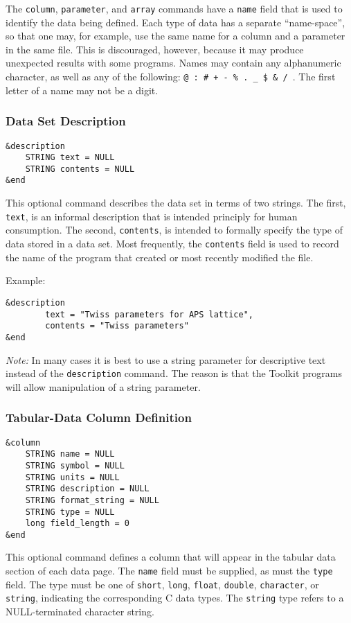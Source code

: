 \documentclass[11pt]{article}
\begin{document}
The {\tt column}, {\tt parameter}, and {\tt array} commands have a {\tt name} field that is used to identify the
data being defined.  Each type of data has a separate ``name-space'', so that one may, for example, use the same
name for a column and a parameter in the same file.  This is discouraged, however, because it may produce
unexpected results with some programs.  Names may contain any alphanumeric character, as well as any of the
following: {\tt @ : \# + - \% . \_ \$ \& / }.  The first letter of a name may not be a digit.


\subsubsection{Data Set Description}
\begin{verbatim}
&description 
    STRING text = NULL
    STRING contents = NULL
&end
\end{verbatim}

This optional command describes the data set in terms of two strings.  The first, {\tt text}, is an informal
description that is intended principly for human consumption.  The second, {\tt contents}, is intended to formally
specify the type of data stored in a data set.  Most frequently, the {\tt contents} field is used to record the
name of the program that created or most recently modified the file.

Example:
\begin{verbatim}
&description
        text = "Twiss parameters for APS lattice",
        contents = "Twiss parameters"
&end
\end{verbatim}

{\em Note:} In many cases it is best to use a string parameter for descriptive text instead of the {\tt description}
command.  The reason is that the Toolkit programs will allow manipulation of a string parameter.

\subsubsection{Tabular-Data Column Definition}
\begin{verbatim}
&column
    STRING name = NULL
    STRING symbol = NULL
    STRING units = NULL
    STRING description = NULL
    STRING format_string = NULL
    STRING type = NULL
    long field_length = 0
&end
\end{verbatim}

This optional command defines a column that will appear in the tabular data section of each data page.  The {\tt name}
field must be supplied, as must the {\tt type} field.  The type must be one of {\tt short}, {\tt long}, {\tt float},
{\tt double}, {\tt character}, or {\tt string}, indicating the corresponding C data types.  The {\tt string} type
refers to a NULL-terminated character string.
\end{document}
